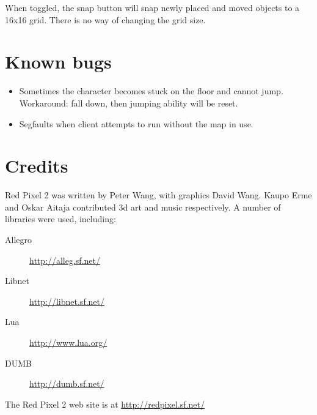 \documentclass[a4paper]{article}
\begin{document}
When toggled, the snap button will snap newly placed and moved objects
to a 16x16 grid.  There is no way of changing the grid size.



\section{Known bugs}

\begin{itemize}

\item Sometimes the character becomes stuck on the floor and cannot
  jump.  Workaround: fall down, then jumping ability will be reset.

\item Segfaults when client attempts to run without the map in use.

\end{itemize}



\section{Credits}

Red Pixel 2 was written by Peter Wang, with graphics David Wang.
Kaupo Erme and Oskar Aitaja contributed 3d art and music respectively.
A number of libraries were used, including:

\begin{description}
\item [Allegro] \url{http://alleg.sf.net/}
\item [Libnet] \url{http://libnet.sf.net/}
\item [Lua] \url{http://www.lua.org/}
\item [DUMB] \url{http://dumb.sf.net/}
\end{description}

\noindent
The Red Pixel 2 web site is at \url{http://redpixel.sf.net/}
\end{document}
